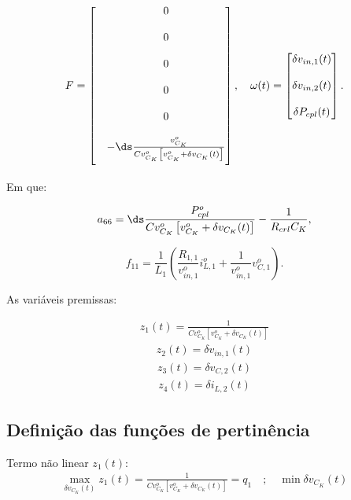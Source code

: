 \begin{gather}
  F = \begin{bmatrix}
     & 0
    \\[12pt]
     & 0
    \\[12pt]
     & 0
    \\[12pt]
     & 0
    \\[12pt]
     & 0
    \\[12pt]
     & - \ds \frac{v_{C_K}^o}{Cv_{C_K}^o \left[ v_{C_K}^o + \delta v_{C_K}(t) \right]}
    \\[12pt]
  \end{bmatrix}, \quad
  \omega(t) = \begin{bmatrix}
    \delta v_{in,1}(t) \\[12pt] \delta v_{in,2}(t) \\[12pt] \delta P_{cpl}(t)
  \end{bmatrix}.
\end{gather}

Em que:

\begin{equation*}
  a_{66} = \ds \frac{P_{cpl}^o}{Cv_{C_K}^o \left[ v_{C_K}^o + \delta v_{C_K}(t) \right]} - \frac{1}{R_{crl} C_K},
\end{equation*}

\begin{equation*}
  f_{11} = \frac{1}{L_1} \left( \frac{R_{1,1}}{v_{in,1}^o}i_{L,1}^o + \frac{1}{v_{in,1}^o}v_{C,1}^o \right).
\end{equation*}


As variáveis premissas:

\begin{gather*}
  z_1(t) = \frac{1}{Cv_{C_K}^o \left[ v_{C_K}^o + \delta v_{C_K}(t) \right]}
\end{gather*}
\begin{gather*}
  z_2(t) = \delta v_{in,1}(t)
\end{gather*}
\begin{gather*}
  z_3(t) = \delta v_{C,2}(t)
\end{gather*}
\begin{gather}
  z_4(t) = \delta i_{L,2}(t)
\end{gather}

\subsection*{Definição das funções de pertinência}

Termo não linear $z_1(t)$:
\begin{gather*}
  \max_{\delta v_{C_K}(t)} z_1(t) = \frac{1}{Cv_{C_K}^o \left[ v_{C_K}^o + \delta v_{C_K}(t) \right]} = q_1 \quad ; \quad \min \delta v_{C_K}(t)
\end{gather*}

